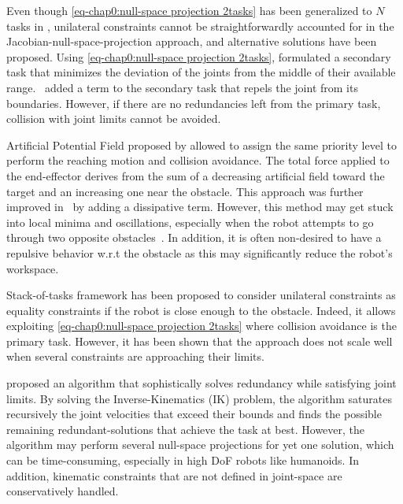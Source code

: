 Even though  \cref{eq-chap0:null-space projection 2tasks} has been generalized to $N$ tasks in \cite{siciliano1991icar}, unilateral constraints cannot be straightforwardly accounted for in the  Jacobian-null-space-projection approach, and alternative solutions have been proposed. 
Using \cref{eq-chap0:null-space projection 2tasks}, \cite{liegeois1977tsmc} formulated a secondary task that minimizes the deviation of the joints from the middle of their available range.~\cite{schwienbacher2011icra} added a term to the secondary task that repels the joint from its boundaries. However, if there are no redundancies left from the primary task, collision with joint limits cannot be avoided. 
 
Artificial Potential Field proposed by \cite{khatib1985icra} allowed to assign the same priority level to perform the reaching motion and collision avoidance. The total force applied to the end-effector derives from the sum of a decreasing artificial field toward the target and an increasing one near the obstacle. This approach was further improved in~\cite{dietrich2011icra} by adding a dissipative term. However, this method may get stuck into local minima and oscillations, especially when the robot attempts to go through two opposite obstacles~\cite{singletary2021iros}. In addition, it is often non-desired to have a repulsive behavior w.r.t the obstacle as this may significantly reduce the robot's workspace. 

Stack-of-tasks framework \cite{mansard2009tro}  has been proposed to consider unilateral constraints as equality constraints if the robot is close enough to the obstacle. Indeed, it allows exploiting \cref{eq-chap0:null-space projection 2tasks} where collision avoidance is the primary task. However, it has been shown that the approach does not scale well when several constraints are approaching their limits. 

\cite{flacco2012icra} proposed an algorithm that sophistically solves redundancy while satisfying joint limits. By solving the Inverse-Kinematics (IK) problem, the algorithm saturates recursively the joint velocities that exceed their bounds and finds the possible remaining redundant-solutions that achieve the task at best. However, the algorithm may perform several null-space projections for yet one solution, which can be time-consuming, especially in high DoF robots like humanoids. In addition, kinematic constraints that are not defined in joint-space are conservatively handled.

